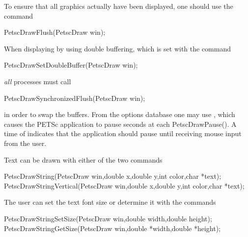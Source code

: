 {{{To ensure that all graphics actually have been displayed, one should use 
 the
command 
\begin{tabbing}
  PetscDrawFlush(PetscDraw win);
\end{tabbing}
When displaying by using double buffering, which is set with the
command  
\begin{tabbing}
  PetscDrawSetDoubleBuffer(PetscDraw win);
\end{tabbing}
{\em all} processes must call 
\begin{tabbing}
  PetscDrawSynchronizedFlush(PetscDraw win);
\end{tabbing}
in order to swap the buffers. From the options database one may use 
 , which  causes the PETSc application 
to pause  seconds at each PetscDrawPause(). A time of 
indicates that the application should pause until receiving mouse 
input from the user.

Text can be drawn with either of the two 
commands  
\begin{tabbing}
  PetscDrawString(PetscDraw win,double x,double y,int color,char *text);\\
  PetscDrawStringVertical(PetscDraw win,double x,double y,int color,char *text);
\end{tabbing}
The user can set the text font size or determine it with the 
commands  
\begin{tabbing}
  PetscDrawStringSetSize(PetscDraw win,double width,double height);\\
  PetscDrawStringGetSize(PetscDraw win,double *width,double *height);
\end{tabbing}

}}}
